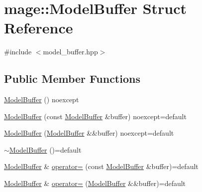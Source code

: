\hypertarget{structmage_1_1_model_buffer}{}\section{mage\+:\+:Model\+Buffer Struct Reference}
\label{structmage_1_1_model_buffer}


{\ttfamily \#include $<$model\+\_\+buffer.\+hpp$>$}

\subsection*{Public Member Functions}
\begin{DoxyCompactItemize}
\item 
\hyperlink{structmage_1_1_model_buffer_a70d4043128afebd2aaff7c57246f98a2}{Model\+Buffer} () noexcept
\item 
\hyperlink{structmage_1_1_model_buffer_afd3db5ed055cfa00f7f68d63898fb6c7}{Model\+Buffer} (const \hyperlink{structmage_1_1_model_buffer}{Model\+Buffer} \&buffer) noexcept=default
\item 
\hyperlink{structmage_1_1_model_buffer_a4ff1edb2bd6e40ec73bf722c8a394ac0}{Model\+Buffer} (\hyperlink{structmage_1_1_model_buffer}{Model\+Buffer} \&\&buffer) noexcept=default
\item 
\hyperlink{structmage_1_1_model_buffer_a9536832e39a72cc597c41ca245eb52ba}{$\sim$\+Model\+Buffer} ()=default
\item 
\hyperlink{structmage_1_1_model_buffer}{Model\+Buffer} \& \hyperlink{structmage_1_1_model_buffer_a003f2105c63f3d7e735c1c00bab5fdee}{operator=} (const \hyperlink{structmage_1_1_model_buffer}{Model\+Buffer} \&buffer)=default
\item 
\hyperlink{structmage_1_1_model_buffer}{Model\+Buffer} \& \hyperlink{structmage_1_1_model_buffer_a2f2c8c5ec6a43c239f349e3c015320e0}{operator=} (\hyperlink{structmage_1_1_model_buffer}{Model\+Buffer} \&\&buffer)=default
\end{DoxyCompactItemize}
